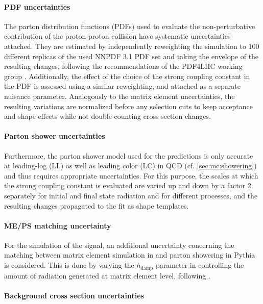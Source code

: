 \paragraph{PDF uncertainties}

The parton distribution functions (PDFs) used to evaluate the non-perturbative contribution of the proton-proton collision have systematic uncertainties attached. They are estimated by independently reweighting the simulation to 100 different replicas of the used NNPDF 3.1 PDF set and taking the envelope of the resulting changes, following the recommendations of the PDF4LHC working group \cite{Butterworth:2015oua}. Additionally, the effect of the choice of the strong coupling constant in the PDF is assessed using a similar reweighting, and attached as a separate nuisance parameter. Analogously to the matrix element uncertainties, the resulting variations are normalized before any selection cuts to keep acceptance and shape effects while not double-counting cross section changes.

\paragraph{Parton shower uncertainties}

Furthermore, the parton shower model used for the predictions is only accurate at leading-log (LL) as well as leading color (LC) in QCD (cf. \cref{sec:mc:showering}) and thus requires appropriate uncertainties. For this purpose, the scales at which the strong coupling constant is evaluated are varied up and down by a factor 2 separately for initial and final state radiation and for different processes, and the resulting changes propagated to the fit as shape templates.

\paragraph{ME/PS matching uncertainty}

For the simulation of the \ttbar signal, an additional uncertainty concerning the matching between matrix element simulation in \powheg and parton showering in Pythia is considered. This is done by varying the $h_{\mathrm{damp}}$ parameter in \powheg controlling the amount of radiation generated at matrix element level, following .

\paragraph{Background cross section uncertainties}

